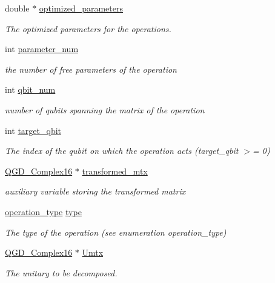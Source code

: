 \begin{DoxyCompactItemize}
double $\ast$ \hyperlink{class_decomposition___base_a38bb2fae99a99736eaafbf9741eb2f5d}{optimized\+\_\+parameters}
\begin{DoxyCompactList}\small\item\em The optimized parameters for the operations. \end{DoxyCompactList}\item 
int \hyperlink{class_operation_aa57505afe5b5ec27f6d053044b86e043}{parameter\+\_\+num}
\begin{DoxyCompactList}\small\item\em the number of free parameters of the operation \end{DoxyCompactList}\item 
int \hyperlink{class_operation_aecd5fbf1dd4ea532b2e58471ff8bad69}{qbit\+\_\+num}
\begin{DoxyCompactList}\small\item\em number of qubits spanning the matrix of the operation \end{DoxyCompactList}\item 
int \hyperlink{class_operation_a3e489b72c124b494777c71b1646bb1e9}{target\+\_\+qbit}
\begin{DoxyCompactList}\small\item\em The index of the qubit on which the operation acts (target\+\_\+qbit $>$= 0) \end{DoxyCompactList}\item 
\hyperlink{struct_q_g_d___complex16}{Q\+G\+D\+\_\+\+Complex16} $\ast$ \hyperlink{class_decomposition___base_ae6fa4013266ee6e702b7e645c6bbfed1}{transformed\+\_\+mtx}
\begin{DoxyCompactList}\small\item\em auxiliary variable storing the transformed matrix \end{DoxyCompactList}\item 
\hyperlink{operations_2include_2_operation_8h_ad99e62941c8e4b13e5fc45ecaaf65eff}{operation\+\_\+type} \hyperlink{class_operation_ad47c56c86d62a4c775571e1600416479}{type}
\begin{DoxyCompactList}\small\item\em The type of the operation (see enumeration operation\+\_\+type) \end{DoxyCompactList}\item 
\hyperlink{struct_q_g_d___complex16}{Q\+G\+D\+\_\+\+Complex16} $\ast$ \hyperlink{class_decomposition___base_a61a784aaba39276260b3f73709b51ccc}{Umtx}
\begin{DoxyCompactList}\small\item\em The unitary to be decomposed. \end{DoxyCompactList}\end{DoxyCompactItemize}


